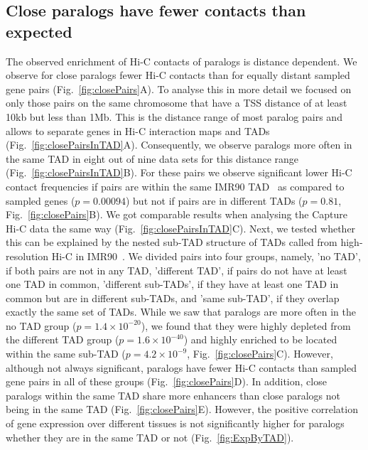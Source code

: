 \documentclass[a4paper,twoside=true,openright,parskip=full,chapterprefix=true,11pt,headings=normal,bibliography=totoc,listof=totoc,titlepage=on,captions=tableabove,draft=false]{scrreprt}
\theoremstyle{definition}
\theoremstyle{definition}
\theoremstyle{definition}
\theoremstyle{remark}
\begin{document}
\subsection{Close paralogs have fewer contacts than
expected}\label{close-paralogs-have-fewer-contacts-than-expected}

The observed enrichment of Hi-C contacts of paralogs is distance
dependent. We observe for close paralogs fewer Hi-C contacts than for
equally distant sampled gene pairs (Fig.~\ref{fig:closePairs}A). To
analyse this in more detail we focused on only those pairs on the same
chromosome that have a TSS distance of at least 10kb but less than 1Mb.
This is the distance range of most paralog pairs and allows to separate
genes in Hi-C interaction maps and TADs
(Fig.~\ref{fig:closePairsInTAD}A). Consequently, we observe paralogs
more often in the same TAD in eight out of nine data sets for this
distance range (Fig.~\ref{fig:closePairsInTAD}B). For these pairs we
observe significant lower Hi-C contact frequencies if pairs are within
the same IMR90 TAD~\citep{Rao2014} as compared to sampled genes
(\(p=0.00094\)) but not if pairs are in different TADs (\(p=0.81\),
Fig.~\ref{fig:closePairs}B). We got comparable results when analysing
the Capture Hi-C data the same way (Fig.~\ref{fig:closePairsInTAD}C).
Next, we tested whether this can be explained by the nested sub-TAD
structure of TADs called from high-resolution Hi-C in
IMR90~\citep{Rao2014}. We divided pairs into four groups, namely, 'no
TAD', if both pairs are not in any TAD, 'different TAD', if pairs do not
have at least one TAD in common, 'different sub-TADs', if they have at
least one TAD in common but are in different sub-TADs, and 'same
sub-TAD', if they overlap exactly the same set of TADs. While we saw
that paralogs are more often in the no TAD group
(\(p=1.4\times10^{-20}\)), we found that they were highly depleted from
the different TAD group (\(p=1.6\times10^{-40}\)) and highly enriched to
be located within the same sub-TAD (\(p=4.2\times10^{-9}\),
Fig.~\ref{fig:closePairs}C). However, although not always significant,
paralogs have fewer Hi-C contacts than sampled gene pairs in all of
these groups (Fig.~\ref{fig:closePairs}D). In addition, close paralogs
within the same TAD share more enhancers than close paralogs not being
in the same TAD (Fig.~\ref{fig:closePairs}E). However, the positive
correlation of gene expression over different tissues is not
significantly higher for paralogs whether they are in the same TAD or
not (Fig.~\ref{fig:ExpByTAD}).
\end{document}
